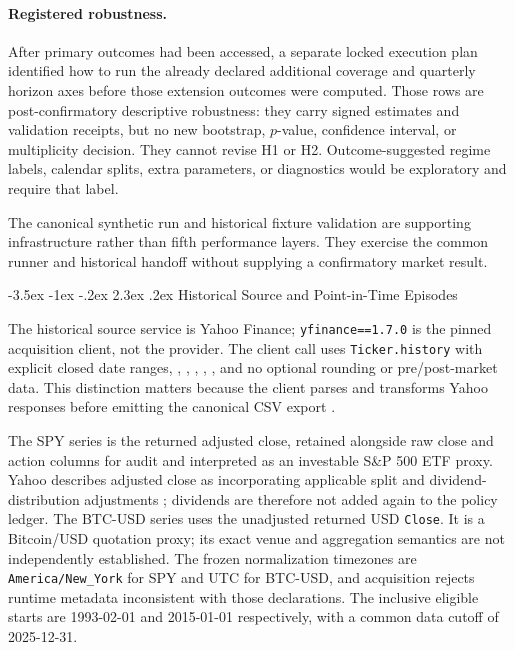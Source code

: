 \documentclass[12pt,a4paper,oneside]{report}
\makeatletter
\renewcommand\section{\@startsection{section}{1}{\z@}%
  {-3.5ex \@plus -1ex \@minus -.2ex}%
  {2.3ex \@plus .2ex}%
  {\normalfont\fontsize{14}{17}\selectfont\bfseries}}
\makeatother
\begin{document}
\paragraph{Registered robustness.}
After primary outcomes had been accessed, a separate locked execution plan
identified how to run the already declared additional coverage and quarterly
horizon axes before those extension outcomes were computed. Those rows are
post-confirmatory descriptive robustness: they carry signed estimates and
validation receipts, but no new bootstrap, $p$-value, confidence interval, or
multiplicity decision. They cannot revise H1 or H2. Outcome-suggested regime
labels, calendar splits, extra parameters, or diagnostics would be exploratory
and require that label.

The canonical synthetic run and historical fixture validation are supporting
infrastructure rather than fifth performance layers. They exercise the common
runner and historical handoff without supplying a confirmatory market result.

\section{Historical Source and Point-in-Time Episodes}
\label{sec:method-historical-source}

The historical source service is Yahoo Finance; \texttt{yfinance==1.7.0} is
the pinned acquisition client, not the provider. The client call
uses \texttt{Ticker.history} with explicit closed date ranges,
, ,
, , , and no
optional rounding or pre/post-market data. This distinction matters because
the client parses and transforms Yahoo responses before emitting the canonical
CSV export \citep{yfinance2026history}.

The SPY series is the returned adjusted close, retained alongside raw close
and action columns for audit and interpreted as an investable S\&P 500 ETF
proxy. Yahoo describes adjusted close as incorporating applicable split and
dividend-distribution adjustments \citep{yahoo2026adjustedclose}; dividends
are therefore not added again to the policy ledger. The BTC-USD series uses
the unadjusted returned USD \texttt{Close}. It is a Bitcoin/USD quotation
proxy; its exact venue and aggregation semantics are not independently
established. The frozen normalization timezones are
\texttt{America/New\_York} for SPY and UTC for BTC-USD, and acquisition rejects
runtime metadata inconsistent with those declarations. The inclusive eligible
starts are 1993-02-01 and 2015-01-01 respectively, with a common data cutoff of
2025-12-31.
\end{document}
